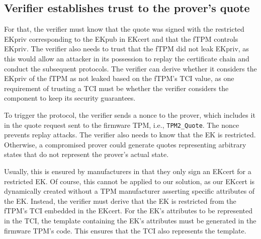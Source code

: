 \subsection{Verifier establishes trust to the prover's quote}\label{subsec:trust_quote_from_prover}

For that, the verifier must know that the quote was signed with the restricted EKpriv corresponding to the EKpub in EKcert and that the fTPM controls EKpriv.
The verifier also needs to trust that the fTPM did not leak EKpriv, as this would allow an attacker in its possession to replay the certificate chain and conduct the subsequent protocols.
The verifier can derive whether it considers the EKpriv of the fTPM as not leaked based on the fTPM's TCI value, as one requirement of trusting a TCI must be whether the verifier considers the component to keep its security guarantees.

To trigger the protocol, the verifier sends a nonce to the prover, which includes it in the quote request sent to the firmware TPM, i.e., \texttt{TPM2\_Quote}.
The nonce prevents replay attacks.
The verifier also needs to know that the EK is restricted.
Otherwise, a compromised prover could generate quotes representing arbitrary states that do not represent the prover's actual state.

Usually, this is ensured by manufacturers in that they only sign an EKcert for a restricted EK\@.
Of course, this cannot be applied to our solution, as our EKcert is dynamically created without a TPM manufacturer asserting specific attributes of the EK\@.
Instead, the verifier must derive that the EK is restricted from the fTPM's TCI embedded in the EKcert.
For the EK's attributes to be represented in the TCI, the template containing the EK's attributes must be generated in the firmware TPM's code.
This ensures that the TCI also represents the template.


